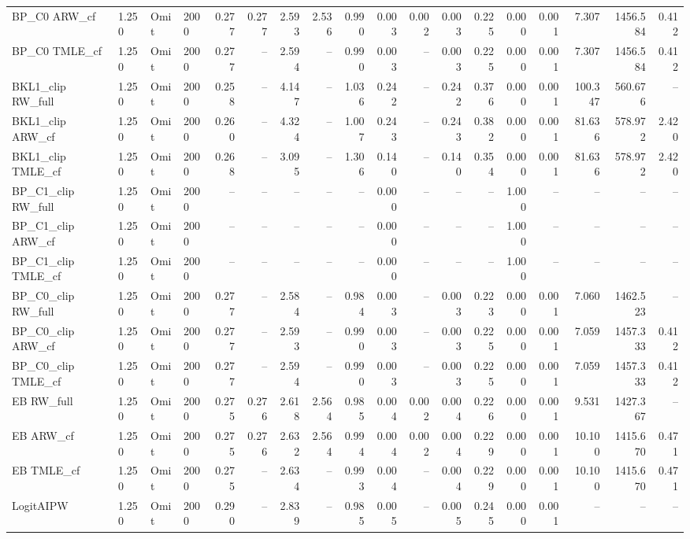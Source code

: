 \begin{tabular}{llllrrrrrrrrrrrrrr}
BP\_C0 ARW\_cf & 1.250 & Omit & 2000 & 0.277 & 0.277 & 2.593 & 2.536 & 0.990 & 0.003 & 0.002 & 0.003 & 0.225 & 0.000 & 0.001 & 7.307 & 1456.584 & 0.412 \\
BP\_C0 TMLE\_cf & 1.250 & Omit & 2000 & 0.277 & -- & 2.594 & -- & 0.990 & 0.003 & -- & 0.003 & 0.225 & 0.000 & 0.001 & 7.307 & 1456.584 & 0.412 \\
BKL1\_clip RW\_full & 1.250 & Omit & 2000 & 0.258 & -- & 4.147 & -- & 1.036 & 0.242 & -- & 0.242 & 0.376 & 0.000 & 0.001 & 100.347 & 560.676 & -- \\
BKL1\_clip ARW\_cf & 1.250 & Omit & 2000 & 0.260 & -- & 4.324 & -- & 1.007 & 0.243 & -- & 0.243 & 0.382 & 0.000 & 0.001 & 81.636 & 578.972 & 2.420 \\
BKL1\_clip TMLE\_cf & 1.250 & Omit & 2000 & 0.268 & -- & 3.095 & -- & 1.306 & 0.140 & -- & 0.140 & 0.354 & 0.000 & 0.001 & 81.636 & 578.972 & 2.420 \\
BP\_C1\_clip RW\_full & 1.250 & Omit & 2000 & -- & -- & -- & -- & -- & 0.000 & -- & -- & -- & 1.000 & -- & -- & -- & -- \\
BP\_C1\_clip ARW\_cf & 1.250 & Omit & 2000 & -- & -- & -- & -- & -- & 0.000 & -- & -- & -- & 1.000 & -- & -- & -- & -- \\
BP\_C1\_clip TMLE\_cf & 1.250 & Omit & 2000 & -- & -- & -- & -- & -- & 0.000 & -- & -- & -- & 1.000 & -- & -- & -- & -- \\
BP\_C0\_clip RW\_full & 1.250 & Omit & 2000 & 0.277 & -- & 2.584 & -- & 0.984 & 0.003 & -- & 0.003 & 0.223 & 0.000 & 0.001 & 7.060 & 1462.523 & -- \\
BP\_C0\_clip ARW\_cf & 1.250 & Omit & 2000 & 0.277 & -- & 2.593 & -- & 0.990 & 0.003 & -- & 0.003 & 0.225 & 0.000 & 0.001 & 7.059 & 1457.333 & 0.412 \\
BP\_C0\_clip TMLE\_cf & 1.250 & Omit & 2000 & 0.277 & -- & 2.594 & -- & 0.990 & 0.003 & -- & 0.003 & 0.225 & 0.000 & 0.001 & 7.059 & 1457.333 & 0.412 \\
EB RW\_full & 1.250 & Omit & 2000 & 0.275 & 0.276 & 2.618 & 2.564 & 0.985 & 0.004 & 0.002 & 0.004 & 0.226 & 0.000 & 0.001 & 9.531 & 1427.367 & -- \\
EB ARW\_cf & 1.250 & Omit & 2000 & 0.275 & 0.276 & 2.632 & 2.564 & 0.994 & 0.004 & 0.002 & 0.004 & 0.229 & 0.000 & 0.001 & 10.100 & 1415.670 & 0.471 \\
EB TMLE\_cf & 1.250 & Omit & 2000 & 0.275 & -- & 2.634 & -- & 0.993 & 0.004 & -- & 0.004 & 0.229 & 0.000 & 0.001 & 10.100 & 1415.670 & 0.471 \\
LogitAIPW & 1.250 & Omit & 2000 & 0.290 & -- & 2.839 & -- & 0.985 & 0.005 & -- & 0.005 & 0.245 & 0.000 & 0.001 & -- & -- & -- \\

\end{tabular}
